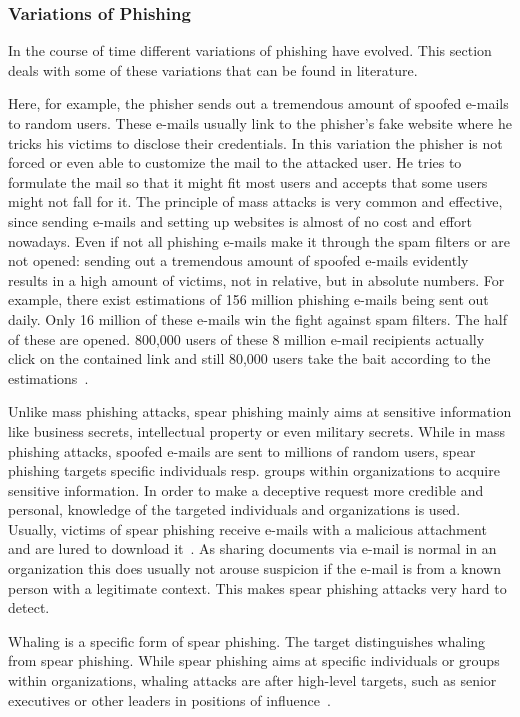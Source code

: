 \subsubsection{Variations of Phishing}
In the course of time different variations of phishing have evolved.
 This section deals with some of these variations that can be found in literature.

\label{s:phishing_variations}

\begin{description}[leftmargin=0cm]
	\item[Mass Phishing] Here, for example, the phisher sends out a tremendous amount of spoofed e-mails to random users.
 These e-mails usually link to the phisher's fake website where he tricks his victims to disclose their credentials.
 In this variation the phisher is not forced or even able to customize the mail to the attacked user.
 He tries to formulate the mail so that it might fit most users and accepts that some users might not fall for it.
 The principle of mass attacks is very common and effective, since sending e-mails and setting up websites is almost of no cost and effort nowadays.
 Even if not all phishing e-mails make it through the spam filters or are not opened: sending out a tremendous amount of spoofed e-mails evidently results in a high amount of victims, not in relative, but in absolute numbers.
 For example, there exist estimations of 156 million phishing e-mails being sent out daily.
 Only 16 million of these e-mails win the fight against spam filters.
 The half of these are opened.
 800,000 users of these 8 million e-mail recipients actually click on the contained link and still 80,000 users take the bait according to the estimations~\cite{takethebait}.  
	\item[Spear Phishing] Unlike mass phishing attacks, spear phishing mainly aims at sensitive information like business secrets, intellectual property or even military secrets.
 While in mass phishing attacks, spoofed e-mails are sent to millions of random users, spear phishing targets specific individuals resp.
 groups within organizations to acquire sensitive information.
 In order to make a deceptive request more credible and personal, knowledge of the targeted individuals and organizations is used.
 Usually, victims of spear phishing receive e-mails with a malicious attachment and are lured to download it~\cite{trendlabs2012spear}.
 As sharing documents via e-mail is normal in an organization this does usually not arouse suspicion if the e-mail is from a known person with a legitimate context.
 This makes spear phishing attacks very hard to detect\cite{trendlabs2012spear,statephishinghong}.
	\item[Whaling] Whaling is a specific form of spear phishing.
 The target distinguishes whaling from spear phishing.
 While spear phishing aims at specific individuals or groups within organizations, whaling attacks are after high-level targets, such as senior executives or other leaders in positions of influence~\cite{whaling}.


\end{description}
